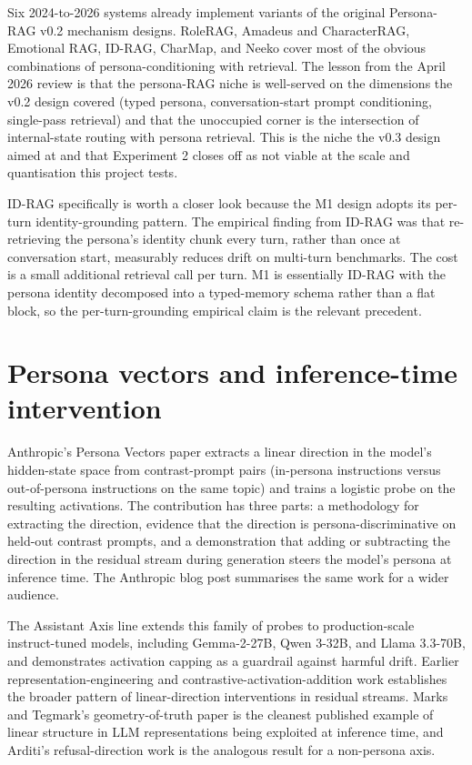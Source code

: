 Six 2024-to-2026 systems already implement variants of the original Persona-RAG v0.2 mechanism designs. RoleRAG\autocite{rolerag2024}, Amadeus and CharacterRAG\autocite{amadeus2024}, Emotional RAG\autocite{emotionalrag2024}, ID-RAG\autocite{idrag2024}, CharMap, and Neeko cover most of the obvious combinations of persona-conditioning with retrieval. The lesson from the April 2026 review is that the persona-RAG niche is well-served on the dimensions the v0.2 design covered (typed persona, conversation-start prompt conditioning, single-pass retrieval) and that the unoccupied corner is the intersection of internal-state routing with persona retrieval. This is the niche the v0.3 design aimed at and that Experiment 2 closes off as not viable at the scale and quantisation this project tests.

ID-RAG specifically is worth a closer look because the M1 design adopts its per-turn identity-grounding pattern\autocite{idrag2024}. The empirical finding from ID-RAG was that re-retrieving the persona's identity chunk every turn, rather than once at conversation start, measurably reduces drift on multi-turn benchmarks. The cost is a small additional retrieval call per turn. M1 is essentially ID-RAG with the persona identity decomposed into a typed-memory schema rather than a flat block, so the per-turn-grounding empirical claim is the relevant precedent.

\section{Persona vectors and inference-time intervention}

Anthropic's Persona Vectors paper extracts a linear direction in the model's hidden-state space from contrast-prompt pairs (in-persona instructions versus out-of-persona instructions on the same topic) and trains a logistic probe on the resulting activations\autocite{chen2025personavectors}. The contribution has three parts: a methodology for extracting the direction, evidence that the direction is persona-discriminative on held-out contrast prompts, and a demonstration that adding or subtracting the direction in the residual stream during generation steers the model's persona at inference time. The Anthropic blog post summarises the same work for a wider audience\autocite{personavectors-anthropic-blog}.

The Assistant Axis line extends this family of probes to production-scale instruct-tuned models, including Gemma-2-27B, Qwen 3-32B, and Llama 3.3-70B, and demonstrates activation capping as a guardrail against harmful drift\autocite{lu2026assistantaxis}. Earlier representation-engineering and contrastive-activation-addition work establishes the broader pattern of linear-direction interventions in residual streams\autocite{repe2023, caa2023, iti2023}. Marks and Tegmark's geometry-of-truth paper is the cleanest published example of linear structure in LLM representations being exploited at inference time\autocite{marks2023geometry}, and Arditi's refusal-direction work is the analogous result for a non-persona axis\autocite{arditi2024refusal}.

